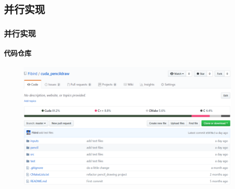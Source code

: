 \documentclass[aspectratio=43, xcolor=svgnames, t, 10pt]{beamer}
\begin{document}
\subsection{并行实现}
\begin{frame}
  \frametitle{并行实现}
  \framesubtitle{代码仓库}
  \begin{figure}
    \centering
    \includegraphics[width=\linewidth]{./figure/code_project.PNG}
  \end{figure}
%
%
%
\end{frame}
\end{document}
